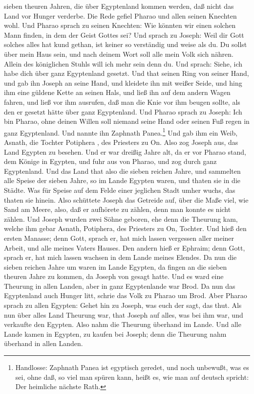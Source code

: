 sieben theuren Jahren, die über Egyptenland kommen werden, daß nicht das Land vor Hunger verderbe. Die Rede gefiel Pharao und allen seinen Knechten wohl. Und Pharao sprach zu seinen Knechten: Wie könnten wir einen solchen Mann finden, in dem der Geist Gottes sei? Und sprach zu Joseph: Weil dir Gott solches alles hat kund gethan, ist keiner so verständig und weise als du. Du sollst über mein Haus sein, und nach deinem Wort soll alle mein Volk sich nähren. Allein des königlichen Stuhls will ich mehr sein denn du. Und sprach: Siehe, ich habe dich über ganz Egyptenland gesetzt. Und that seinen Ring von seiner Hand, und gab ihn Joseph an seine Hand, und kleidete ihn mit weißer Seide, und hing ihm eine güldene Kette an seinen Hals, und ließ ihn auf dem andern Wagen fahren, und ließ vor ihm ausrufen, daß man die Knie vor ihm beugen sollte, als den er gesetzt hätte über ganz Egyptenland. Und Pharao sprach zu Joseph: Ich bin Pharao, ohne deinen Willen soll niemand seine Hand oder seinen Fuß regen in ganz Egyptenland. Und nannte ihn Zaphnath Panea.\footnote{Handlosse: Zaphnath Panea ist egyptisch geredet, und noch unbewußt, was es sei, ohne daß, so viel man spüren kann, heißt es, wie man auf deutsch spricht: Der heimliche nächste Rath.} Und gab ihm ein Weib, Asnath, die Tochter Potiphera
, des Priesters zu On. Also zog Joseph aus, das Land Egypten zu besehen. Und er war dreißig Jahre alt, da er vor Pharao stand, dem Könige in Egypten, und fuhr aus von Pharao, und zog durch ganz Egyptenland. Und das Land that also die sieben reichen Jahre, und sammelten alle Speise der sieben Jahre, so im Lande Egypten waren, und thaten sie in die Städte. Was für Speise auf dem Felde einer jeglichen Stadt umher wuchs, das thaten sie hinein. Also schüttete Joseph das Getreide auf, über die Maße viel, wie Sand am Meere, also, daß er aufhörete zu zählen, denn man konnte es nicht zählen. Und Joseph wurden zwei Söhne geboren, ehe denn die Theurung kam, welche ihm gebar Asnath, Potiphera, des Priesters zu On, Tochter. Und hieß den ersten Manasse; denn Gott, sprach er, hat mich lassen vergessen aller meiner Arbeit, und alle meines Vaters Hauses. Den andern hieß er Ephraim; denn Gott, sprach er, hat mich lassen wachsen in dem Lande meines Elendes. Da nun die sieben reichen Jahre um waren im Lande Egypten, da fingen an die sieben theuren Jahre zu kommen, da Joseph von gesagt hatte. Und es ward eine Theurung in allen Landen, aber in ganz Egyptenlande war Brod. Da nun das Egyptenland auch Hunger litt, schrie das Volk zu Pharao um Brod. Aber Pharao sprach zu allen Egypten: Gehet hin zu Joseph, was euch der sagt, das thut. Als nun über alles Land Theurung war, that Joseph auf alles, was bei ihm war, und verkaufte den Egypten. Also nahm die Theurung überhand im Lande. Und alle Lande kamen in Egypten, zu kaufen bei Joseph; denn die Theurung nahm überhand in allen Landen.

